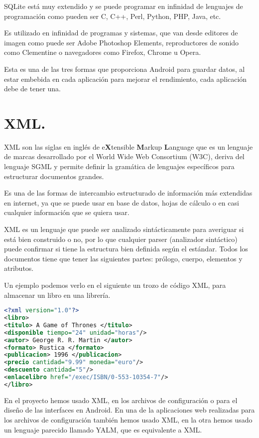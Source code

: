 SQLite está muy extendido y se puede programar en infinidad de lenguajes de programación como pueden ser C, C++, Perl, Python, PHP, Java, etc.

Es utilizado en infinidad de programas y sistemas, que van desde editores de imagen como puede ser Adobe Photoshop Elements, reproductores de sonido como Clementine o navegadores como Firefox, Chrome u Opera.

Esta es una de las tres formas que proporciona Android para guardar datos, al estar embebida en cada aplicación para mejorar el rendimiento, cada aplicación debe de tener una. 

\section{XML.}

XML son las siglas en inglés de e\textbf{X}tensible \textbf{M}arkup \textbf{L}anguage que es un lenguaje de marcas desarrollado por el World Wide Web Consortium (W3C), deriva del lenguaje SGML y permite definir la gramática de lenguajes específicos para estructurar documentos grandes.

Es una de las formas de intercambio estructurado de información más extendidas en internet, ya que se puede usar en base de datos, hojas de cálculo o en casi cualquier información que se quiera usar.

XML es un lenguaje que puede ser analizado sintácticamente para averiguar si está bien construido o no, por lo que cualquier parser (analizador sintáctico) puede confirmar si tiene la estructura bien definida según el estándar. Todos los documentos tiene que tener las siguientes partes: prólogo, cuerpo, elementos y atributos.

Un ejemplo podemos verlo en el siguiente un trozo de código XML, para almacenar un libro en una librería.

\begin{lstlisting}[language=XML]   
<?xml version="1.0"?>
<libro>
<titulo> A Game of Thrones </titulo>
<disponible tiempo="24" unidad="horas"/>
<autor> George R. R. Martin </autor>
<formato> Rustica </formato>
<publicacion> 1996 </publicacion>
<precio cantidad="9.99" moneda="euro"/>
<descuento cantidad="5"/>
<enlacelibro href="/exec/ISBN/0-553-10354-7"/>
</libro>
\end{lstlisting}

En el proyecto hemos usado XML, en los archivos de configuración o para el diseño de las interfaces en Android. En una de la aplicaciones web realizadas para los archivos de configuración también hemos usado XML, en la otra hemos usado un lenguaje parecido llamado YALM, que es equivalente a XML.

